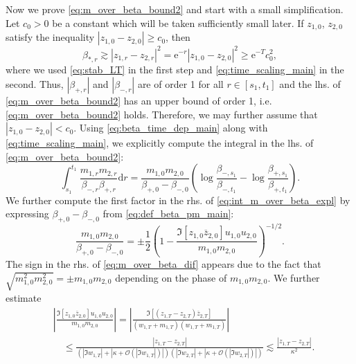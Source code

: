 \documentclass[10pt]{amsart}
\numberwithin{equation}{section}
\newcommand{\dif}{\mathrm{d}}
\newcommand{\ee}{\mathrm{e}}
\begin{document}
Now we prove \eqref{eq:m_over_beta_bound2} and start with a small simplification. Let $c_0>0$ be a constant which will be taken sufficiently small later. If $z_{1,0}$, $z_{2,0}$ satisfy the inequality $|z_{1,0}-z_{2,0}|\ge c_0$, then
\begin{equation*}
\beta_{*,r}\gtrsim |z_{1,r}-z_{2,r}|^2=\ee^{-r}|z_{1,0}-z_{2,0}|^2\ge \ee^{-T}c_0^2,
\end{equation*}
where we used \eqref{eq:stab_LT} in the first step and \eqref{eq:time_scaling_main} in the second. Thus, $|\beta_{+,r}|$ and $|\beta_{-,r}|$ are of order 1 for all $r\in [s_1,t_1]$ and the lhs. of \eqref{eq:m_over_beta_bound2} has an upper bound of order 1, i.e. \eqref{eq:m_over_beta_bound2} holds. Therefore, we may further assume that $|z_{1,0}-z_{2,0}|<c_0$. Using \eqref{eq:beta_time_dep_main} along with \eqref{eq:time_scaling_main}, we explicitly compute the integral in the lhs. of \eqref{eq:m_over_beta_bound2}:
\begin{equation}
\int_{s_1}^{t_1} \frac{m_{1,r}m_{2,r}}{\beta_{-,r}\beta_{+,r}}\dif r = \frac{m_{1,0}m_{2,0}}{\beta_{+,0}-\beta_{-,0}}\left(\log \frac{\beta_{-,s_1}}{\beta_{-,t_1}}-\log \frac{\beta_{+,s_1}}{\beta_{+,t_1}}\right).
\label{eq:int_m_over_beta_expl}
\end{equation}
We further compute the first factor in the rhs. of \eqref{eq:int_m_over_beta_expl} by expressing $\beta_{+,0}-\beta_{-,0}$ from \eqref{eq:def_beta_pm_main}:
\begin{equation}
\frac{m_{1,0}m_{2,0}}{\beta_{+,0}-\beta_{-,0}} = \pm \frac{1}{2} \left( 1- \frac{\Im [z_{1,0}\overline{z}_{2,0}]u_{1,0}u_{2,0}}{m_{1,0}m_{2,0}}\right)^{-1/2}.
\label{eq:m_over_beta_dif}
\end{equation}
The sign in the rhs. of \eqref{eq:m_over_beta_dif} appears due to the fact that $\sqrt{m_{1,0}^2m_{2,0}^2}=\pm m_{1,0}m_{2,0}$ depending on the phase of $m_{1,0}m_{2,0}$. We further estimate
\begin{equation}
\begin{split}
&\left\vert\frac{\Im [z_{1,0}\overline{z}_{2,0}]u_{1,0}u_{2,0}}{m_{1,0}m_{2,0}}\right\vert = \left\vert\frac{\Im [(z_{1,T}-z_{2,T})\overline{z}_{2,T}]}{(w_{1,T}+m_{1,T})(w_{1,T}+m_{1,T})}\right\vert\\
&\quad\le \frac{|z_{1,T}-z_{2,T}|}{\left(|\Im w_{1,T}| + |\kappa+\mathcal{O}(|\Im w_{1,T}|)|\right)\left(|\Im w_{2,T}| + |\kappa+\mathcal{O}(|\Im w_{2,T}|)|\right)}\lesssim \frac{|z_{1,T}-z_{2,T}|}{\kappa^2}.
\end{split}
\label{eq:dif_z_term}
\end{equation}
\end{document}
